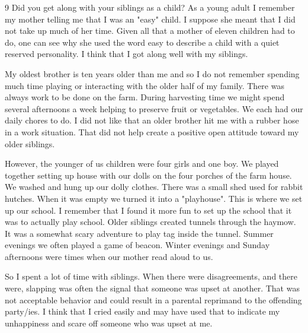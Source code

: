 9 Did you get along with your siblings as a child?
As a young adult I remember my mother telling me that I was an "easy" child.
I suppose she meant that I did not take up much of her time.
Given all that a mother of eleven children had to do, one can see why she used the word easy to describe a child with a quiet reserved personality.
I think that I got along well with my siblings.

My oldest brother is ten years older than me and so I do not remember spending much time playing or interacting with the older half of my family.
There was always work to be done on the farm.
During harvesting time we might spend several afternoons a week helping to preserve fruit or vegetables.
We each had our daily chores to do.
I did not like that an older brother hit me with a rubber hose in a work situation.
That did not help create a positive open attitude toward my older siblings.

However, the younger of us children were four girls and one boy.
We played together setting up house with our dolls on the four porches of the farm house.
We washed and hung up our dolly clothes.
There was a small shed used for rabbit hutches.
When it was empty we turned it into a "playhouse".
This is where we set up our school.
I remember that I found it more fun to set up the school that it was to actually play school.
Older siblings created tunnels through the haymow.
It was a somewhat scary adventure to play tag inside the tunnel.
Summer evenings we often played a game of beacon.
Winter evenings and Sunday afternoons were times when our mother read aloud to us.

So I spent a lot of time with siblings.
When there were disagreements, and there were, slapping was often the signal that someone was upset at another.
That was not acceptable behavior and could result in a parental reprimand to the offending party/ies.
I think that I cried easily and may have used that to indicate my unhappiness and scare off someone who was upset at me.





